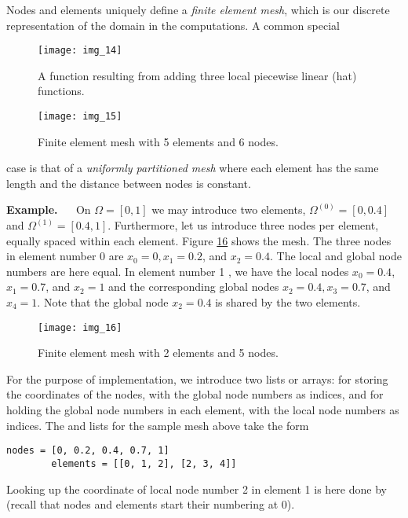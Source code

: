 \documentclass[../main.tex]{subfiles}
\begin{document}
	Nodes and elements uniquely define a \textit{finite element mesh}, which is our discrete representation of the domain in the computations. A common special
	\begin{figure}[H]
		\centering
		\texttt{[image: img\_14]}
		\caption{A function resulting from adding three local piecewise linear (hat)
			functions.}
		\label{fig:img_14}
	\end{figure}
	\begin{figure}[H]
		\centering
		\texttt{[image: img\_15]}
		\caption{Finite element mesh with 5 elements and 6 nodes.}
		\label{fig:img_15}
	\end{figure}
	
	\noindent case is that of a \textit{uniformly partitioned mesh} where each element has the same
	length and the distance between nodes is constant.
	
	\noindent \textbf{Example.} $\quad$ On $\Omega=[0,1]$ we may introduce two elements, $\Omega^{(0)}=[0,0.4]$ and $\Omega^{(1)}=[0.4,1]$. Furthermore, let us introduce three nodes per element, equally spaced within each element. Figure \hyperref[fig:img_16]{16} shows the mesh. The three nodes in element number 0 are $x_{0}=0, x_{1}=0.2$, and $x_{2}=0.4$. The local and global node numbers are here equal. In element number 1 , we have the local nodes $x_{0}=0.4$, $x_{1}=0.7$, and $x_{2}=1$ and the corresponding global nodes $x_{2}=0.4, x_{3}=0.7$, and $x_{4}=1$. Note that the global node $x_{2}=0.4$ is shared by the two elements.
	\begin{figure}[H]
		\centering
		\texttt{[image: img\_16]}
		\caption{Finite element mesh with 2 elements and 5 nodes.}
		\label{fig:img_16}
	\end{figure}
	
	For the purpose of implementation, we introduce two lists or arrays: 
	for storing the coordinates of the nodes, with the global node numbers as indices,
	and  for holding the global node numbers in each element, with the
	local node numbers as indices. The  and  lists for the sample
	mesh above take the form
	\begin{lstlisting}[numbers=none]
		nodes = [0, 0.2, 0.4, 0.7, 1]
		elements = [[0, 1, 2], [2, 3, 4]]	
	\end{lstlisting}
	Looking up the coordinate of local node number 2 in element 1 is here done by
	 (recall that nodes and elements start their numbering
	at 0).
	
\end{document}

